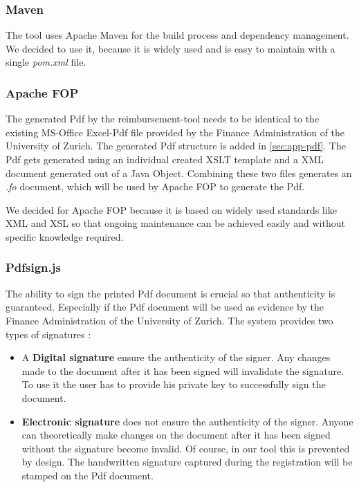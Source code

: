 \subsubsection{Maven}
The tool uses Apache Maven \cite{maven} for the build process and dependency management. We decided to use it, because it is widely used and is easy to maintain with a single \textit{pom.xml} file.

\subsubsection{Apache FOP}
The generated Pdf by the reimbursement-tool needs to be identical to the existing MS-Office Excel-Pdf file provided by the Finance Administration of the University of Zurich. The generated Pdf structure is added in \ref{sec:app-pdf}.\newline
The Pdf gets generated using an individual created XSLT template and a XML document generated out of a Java Object. Combining these two files generates an \textit{.fo} document, which will be used by Apache FOP \cite{apache-fop} to generate the Pdf.\par
We decided for Apache FOP because it is based on widely used standards like XML and XSL so that ongoing maintenance can be achieved easily and without specific knowledge required.

\subsubsection{Pdfsign.js}
The ability to sign the printed Pdf document is crucial so that authenticity is guaranteed. Especially if the Pdf document will be used as evidence by the Finance Administration of the University of Zurich. The system provides two types of signatures \cite{arx-signature}:
\begin{itemize}
	\item A \textbf{Digital signature} ensure the authenticity of the signer. Any changes made to the document after it has been signed will invalidate the signature. To use it the user has to provide his private key to successfully sign the document.
	\item \textbf{Electronic signature} does not ensure the authenticity of the signer. Anyone can theoretically make changes on the document after it has been signed without the signature become invalid. Of course, in our tool this is prevented by design. The handwritten signature captured during the registration will be stamped on the Pdf document.
\end{itemize}\par


